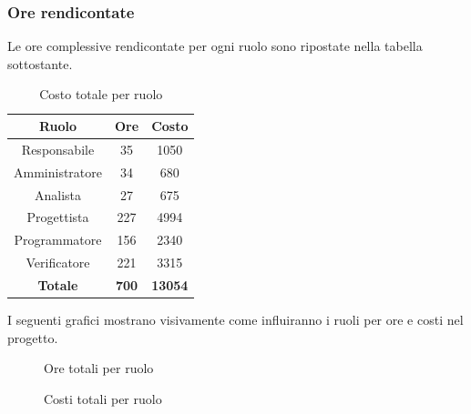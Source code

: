 \subsubsection{Ore rendicontate}
Le ore complessive rendicontate per ogni ruolo sono ripostate nella tabella sottostante.
\begin{table}[H]
	\centering
	\begin{tabular}{|c|c|c|}
		\hline
		\textbf{Ruolo} &
		\textbf{Ore} &
		\textbf{Costo} \\
		\hline
		Responsabile & 35 & 1050\\
		\hline
		Amministratore & 34 & 680\\
		\hline
		Analista & 27 & 675\\
		\hline
		Progettista & 227 & 4994 \\
		\hline
		Programmatore & 156 & 2340 \\
		\hline
		Verificatore & 221 & 3315\\
		\hline
		\textbf{Totale} & \textbf{700} & \textbf{13054} \\
		\hline
	\end{tabular}
	\caption{Costo totale per ruolo}
\end{table}
I seguenti grafici mostrano visivamente come influiranno i ruoli per ore e costi nel progetto.
\begin{figure}[H]
	\centering
	\caption{Ore totali per ruolo}
\end{figure}
\begin{figure}[H]
	\centering
	\caption{Costi totali per ruolo}
\end{figure}





